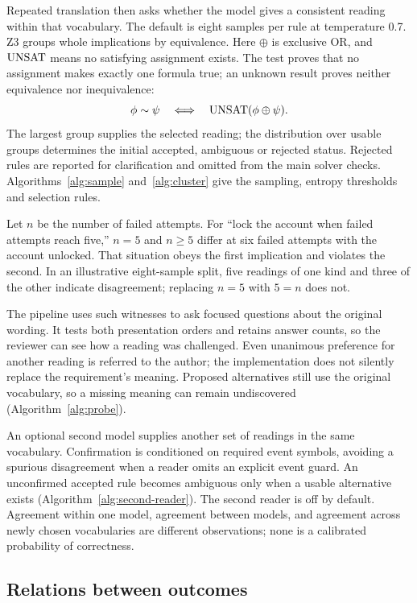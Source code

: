 Repeated translation then asks whether the model gives a consistent reading within that vocabulary. The default is eight samples per rule at temperature 0.7. Z3 groups whole implications by equivalence. Here $\oplus$ is exclusive OR, and $\operatorname{UNSAT}$ means no satisfying assignment exists. The test proves that no assignment makes exactly one formula true; an unknown result proves neither equivalence nor inequivalence:
\[
 \phi\sim\psi\quad\Longleftrightarrow\quad\operatorname{UNSAT}(\phi\mathbin{\oplus}\psi).
\]
The largest group supplies the selected reading; the distribution over usable groups determines the initial accepted, ambiguous or rejected status. Rejected rules are reported for clarification and omitted from the main solver checks. Algorithms~\ref{alg:sample} and~\ref{alg:cluster} give the sampling, entropy thresholds and selection rules.

Let $n$ be the number of failed attempts. For ``lock the account when failed attempts reach five,'' $n=5$ and $n\ge5$ differ at six failed attempts with the account unlocked. That situation obeys the first implication and violates the second. In an illustrative eight-sample split, five readings of one kind and three of the other indicate disagreement; replacing $n=5$ with $5=n$ does not.

The pipeline uses such witnesses to ask focused questions about the original wording. It tests both presentation orders and retains answer counts, so the reviewer can see how a reading was challenged. Even unanimous preference for another reading is referred to the author; the implementation does not silently replace the requirement's meaning. Proposed alternatives still use the original vocabulary, so a missing meaning can remain undiscovered (Algorithm~\ref{alg:probe}).

An optional second model supplies another set of readings in the same vocabulary. Confirmation is conditioned on required event symbols, avoiding a spurious disagreement when a reader omits an explicit event guard. An unconfirmed accepted rule becomes ambiguous only when a usable alternative exists (Algorithm~\ref{alg:second-reader}). The second reader is off by default. Agreement within one model, agreement between models, and agreement across newly chosen vocabularies are different observations; none is a calibrated probability of correctness.

\subsection{Relations between outcomes}

